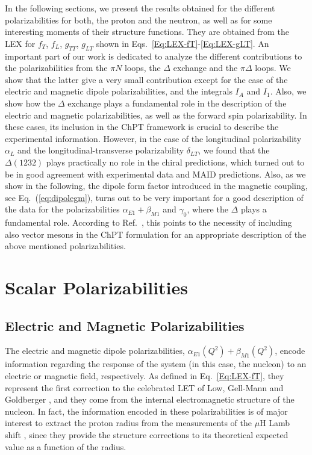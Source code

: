 \documentclass[twocolumn,prc,showpacs,nofootinbib,preprintnumbers,amsmath,amssymb,superscriptaddress]{revtex4-1}
\def\Eqref#1{Eq.~(\ref{eq:#1})}
\begin{document}
In the following sections, we present the results obtained for the different polarizabilities for both, the proton and the neutron, as well as for some interesting moments of their structure functions.
They are obtained from the LEX for $f_T$, $f_L$, $g_{TT}$, $g_{LT}$ shown in Eqs.~\eqref{Eq:LEX-fT}-\eqref{Eq:LEX-gLT}.
An important part of our work is dedicated to analyze the different contributions to the polarizabilities from the $\pi N$ loops, the $\Delta$ exchange and the $\pi\Delta$ loops.
We show that the latter give a very small contribution except for the case of the electric and magnetic dipole polarizabilities, and the integrals $I_A$ and $I_1$.
Also, we show how the $\Delta$ exchange plays a fundamental role in the description of the electric and magnetic polarizabilities, as well as the forward spin polarizability. 
In these cases, its inclusion in the ChPT framework is crucial to describe the experimental information. 
However, in the case of the longitudinal polarizability $\alpha_L$ and the longitudinal-transverse polarizability $\delta_{LT}$, we found that the $\Delta(1232)$ plays practically no role in the chiral predictions, which turned out to be in good agreement with experimental data and MAID predictions.
Also, as we show in the following, the dipole form factor introduced in the magnetic coupling, see \Eqref{dipolegm}, turns out to be very important for a good description of the data for the polarizabilities $\alpha_{E1}+\beta_{M1}$ and $\gamma_0$, where the $\Delta$ plays a fundamental role. 
According to Ref.~\cite{Pascalutsa:2005vq}, this points to the necessity of including also vector mesons in the ChPT formulation for an appropriate description of the above mentioned polarizabilities.
 

\section{Scalar Polarizabilities}
\label{Sec:Scalar-Pol}

\subsection{Electric and Magnetic Polarizabilities}

The electric and magnetic dipole polarizabilities, $\alpha_{E1}(Q^2)+\beta_{M1}(Q^2)$, encode information regarding the response of the system (in this case, the nucleon) to an electric or magnetic field, respectively.
As defined in Eq.~\eqref{Eq:LEX-fT}, they represent the first correction to the celebrated LET of Low, Gell-Mann and Goldberger \cite{LET}, and they come from the internal electromagnetic structure of the nucleon.
In fact, the information encoded in these polarizabilities is of major interest to extract the proton radius from the measurements of the $\mu$H Lamb shift \cite{Birse:2012eb,Alarcon:2013cba,Carlson:2011zd,Nevado:2007dd,Peset:2014yha,Hagelstein:2017cbl}, since they provide the structure corrections to its theoretical expected value as a function of the radius.
\end{document}
